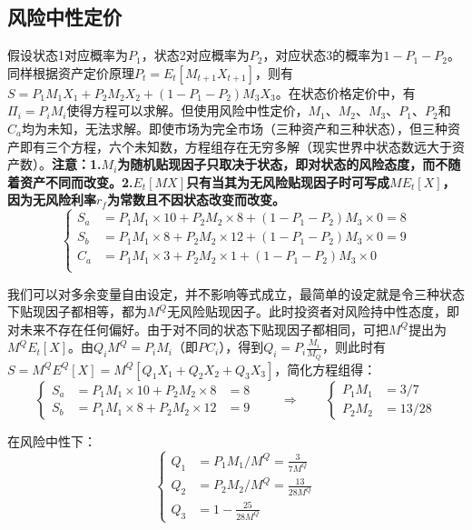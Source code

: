 \documentclass[11pt]{article}
\begin{document}
\subsection{风险中性定价}
假设状态1对应概率为$P_1$，状态2对应概率为$P_2$，对应状态3的概率为$1-P_1-P_2$。同样根据资产定价原理$P_t=E_t[M_{t+1}X_{t+1}]$，则有$S=P_1M_1X_1 + P_2M_2X_2+(1-P_1-P_2)M_3X_3$。在状态价格定价中，有$\Pi_i = P_iM_i$使得方程可以求解。但使用风险中性定价，$M_1$、$M_2$、$M_3$、$P_1$、$P_2$和$C_a$均为未知，无法求解。即使市场为完全市场（三种资产和三种状态），但三种资产即有三个方程，六个未知数，方程组存在无穷多解（现实世界中状态数远大于资产数）。\textbf{注意：1.$M_i$为随机贴现因子只取决于状态，即对状态的风险态度，而不随着资产不同而改变。2.$E_t[MX]$只有当其为无风险贴现因子时可写成$ME_t[X]$，因为无风险利率$r_f$为常数且不因状态改变而改变。}
\begin{equation*}
  \left\{
    \begin{aligned}
      S_a &= P_1M_1 \times 10 + P_2M_2 \times 8 + (1-P_1-P_2)M_3 \times 0 = 8\\
      S_b &= P_1M_1 \times 8 + P_2M_2 \times 12 + (1-P_1-P_2)M_3 \times 0 = 9\\
      C_a &= P_1M_1 \times 3 + P_2M_2 \times 1 + (1-P_1-P_2)M_3 \times 0 \\
    \end{aligned}
  \right.
\end{equation*}

我们可以对多余变量自由设定，并不影响等式成立，最简单的设定就是令三种状态下贴现因子都相等，都为$M^Q$无风险贴现因子。此时投资者对风险持中性态度，即对未来不存在任何偏好。由于对不同的状态下贴现因子都相同，可把$M^Q$提出为$M^QE_t[X]$。由$Q_i M^Q = P_i M_i$（即$PC_i$），得到$Q_i = P_i \frac{M_i}{M_Q}$，则此时有$S = M^Q E^Q[X] = M^Q[Q_1X_1 + Q_2X_2 + Q_3X_3]$，简化方程组得：
\begin{equation*}
  \left\{
    \begin{aligned}
      S_a &= P_1M_1 \times 10 + P_2M_2 \times 8  &= 8 \\
      S_b &= P_1M_1 \times 8 + P_2M_2 \times 12  &= 9
    \end{aligned}
  \right.
  \qquad
  \Rightarrow
  \qquad
  \left\{
    \begin{aligned}
    P_1M_1 &= 3/7 \\
    P_2M_2 &= 13/28
    \end{aligned}
  \right.
\end{equation*}

在风险中性下：
\begin{equation*}
  \left\{
  \begin{aligned}
    Q_1 &= P_1M_1 / M^Q = \frac{3}{7 M^Q} \\ 
    Q_2 &= P_2M_2 / M^Q = \frac{13}{28 M^Q}\\
    Q_3 &= 1 - \frac{25}{28 M^Q}
  \end{aligned}
  \right.
\end{equation*}
\end{document}
